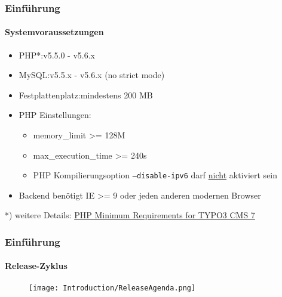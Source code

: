 \begin{frame}[fragile]
	\frametitle{Einführung}
	\framesubtitle{Systemvoraussetzungen}

	\begin{itemize}
		\item PHP*:\tabto{3cm}v5.5.0 - v5.6.x
		\item MySQL:\tabto{3cm}v5.5.x - v5.6.x (no strict mode)
		\item Festplattenplatz:\tabto{3cm}mindestens 200 MB
		\item PHP Einstellungen:

			\begin{itemize}
				\item memory\_limit >= 128M
				\item max\_execution\_time >= 240s
				\item PHP Kompilierungsoption \texttt{--disable-ipv6} darf \underline{nicht} aktiviert sein
			\end{itemize}

		\item Backend benötigt IE >= 9 oder jeden anderen modernen Browser

	\end{itemize}

	\vspace{1cm}
	*) weitere Details: \href{http://typo3.org/news/article/php-minimum-requirements-for-typo3-cms-7/}{PHP Minimum Requirements for TYPO3 CMS 7}

\end{frame}

\begin{frame}[fragile]
	\frametitle{Einführung}
	\framesubtitle{Release-Zyklus}

	\begin{figure}
		\texttt{[image: Introduction/ReleaseAgenda.png]}
	\end{figure}

\end{frame}


